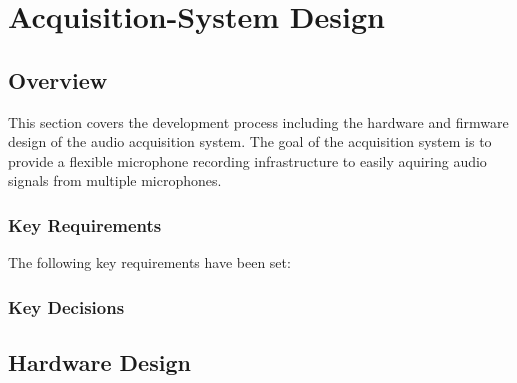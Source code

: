 \chapter{Acquisition-System Design}
\section{Overview}
This section covers the development process including the hardware and firmware design of the audio acquisition system.
The goal of the acquisition system is to provide a flexible microphone recording infrastructure to easily aquiring audio signals from multiple microphones.


\subsection{Key Requirements}

The following key requirements have been set:

\subsection{Key Decisions}



\newpage
\section{Hardware Design}

